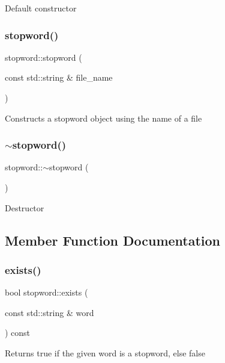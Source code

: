 Default constructor \mbox{\label{classstopword_accb49b6c9d5ddc75002348a869df5619}} 
\subsubsection{\texorpdfstring{stopword()}{stopword()}\hspace{0.1cm}{\footnotesize\ttfamily [2/2]}}
{\footnotesize\ttfamily stopword\+::stopword (\begin{DoxyParamCaption}\item[{const std\+::string \&}]{file\+\_\+name }\end{DoxyParamCaption})}

Constructs a stopword object using the name of a file \mbox{\label{classstopword_aee102291edf88348aad736a35c961fdf}} 
\subsubsection{\texorpdfstring{$\sim$stopword()}{~stopword()}}
{\footnotesize\ttfamily stopword\+::$\sim$stopword (\begin{DoxyParamCaption}{ }\end{DoxyParamCaption})}

Destructor 

\subsection{Member Function Documentation}
\mbox{\label{classstopword_a11210085752c2b3d63055490c13b6666}} 
\subsubsection{\texorpdfstring{exists()}{exists()}}
{\footnotesize\ttfamily bool stopword\+::exists (\begin{DoxyParamCaption}\item[{const std\+::string \&}]{word }\end{DoxyParamCaption}) const}

Returns true if the given word is a stopword, else false \mbox{\label{classstopword_a0bee2c17bb62af157dae20b9242805aa}} 
